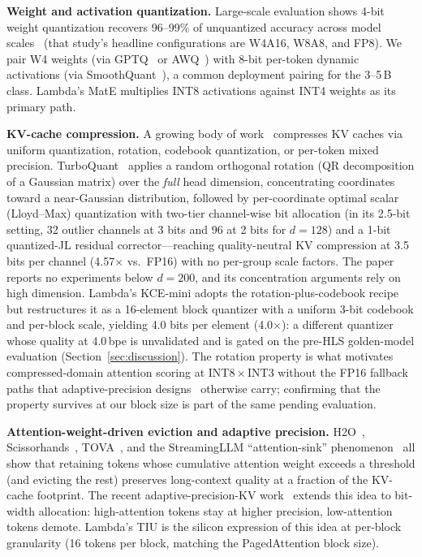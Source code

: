 \documentclass[conference]{IEEEtran}
\begin{document}
\textbf{Weight and activation quantization.} Large-scale evaluation shows 4-bit weight quantization recovers 96--99\% of unquantized accuracy across model scales~\cite{w4a8_acl25} (that study's headline configurations are W4A16, W8A8, and FP8). We pair W4 weights (via GPTQ~\cite{gptq} or AWQ~\cite{awq}) with 8-bit per-token dynamic activations (via SmoothQuant~\cite{smoothquant}), a common deployment pairing for the 3--5\,B class. Lambda's MatE multiplies INT8 activations against INT4 weights as its primary path.

\textbf{KV-cache compression.} A growing body of work~\cite{turboquant,kvquant,kv_survey,quarot,rotatekv} compresses KV caches via uniform quantization, rotation, codebook quantization, or per-token mixed precision. TurboQuant~\cite{turboquant} applies a random orthogonal rotation (QR decomposition of a Gaussian matrix) over the \emph{full} head dimension, concentrating coordinates toward a near-Gaussian distribution, followed by per-coordinate optimal scalar (Lloyd--Max) quantization with two-tier channel-wise bit allocation (in its 2.5-bit setting, 32 outlier channels at 3 bits and 96 at 2 bits for $d{=}128$) and a 1-bit quantized-JL residual corrector---reaching quality-neutral KV compression at 3.5 bits per channel (4.57$\times$ vs.\ FP16) with no per-group scale factors. The paper reports no experiments below $d{=}200$, and its concentration arguments rely on high dimension. Lambda's KCE-mini adopts the rotation-plus-codebook recipe but restructures it as a 16-element block quantizer with a uniform 3-bit codebook and per-block scale, yielding 4.0 bits per element (4.0$\times$): a different quantizer whose quality at 4.0\,bpe is unvalidated and is gated on the pre-HLS golden-model evaluation (Section~\ref{sec:discussion}). The rotation property is what motivates compressed-domain attention scoring at INT8\,$\times$\,INT3 without the FP16 fallback paths that adaptive-precision designs~\cite{adaptive_kv} otherwise carry; confirming that the property survives at our block size is part of the same pending evaluation.

\textbf{Attention-weight-driven eviction and adaptive precision.} H2O~\cite{h2o}, Scissorhands~\cite{scissorhands}, TOVA~\cite{tova}, and the StreamingLLM ``attention-sink'' phenomenon~\cite{streamingllm} all show that retaining tokens whose cumulative attention weight exceeds a threshold (and evicting the rest) preserves long-context quality at a fraction of the KV-cache footprint. The recent adaptive-precision-KV work~\cite{adaptive_kv} extends this idea to bit-width allocation: high-attention tokens stay at higher precision, low-attention tokens demote. Lambda's TIU is the silicon expression of this idea at per-block granularity (16 tokens per block, matching the PagedAttention block size).
\end{document}
